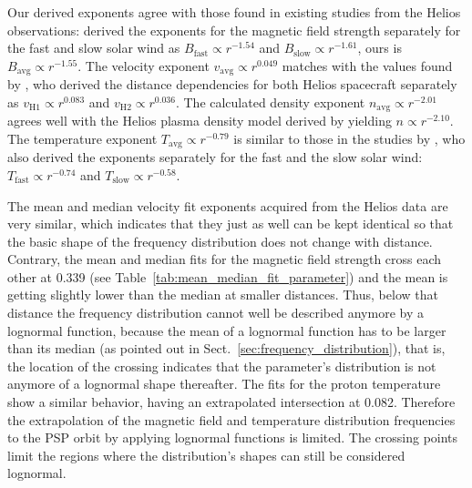 Our derived exponents agree with those found in existing studies from the Helios observations: \citet{Mariani1978} derived the exponents for the magnetic field strength separately for the fast and slow solar wind as $B_\text{fast} \propto r^{-1.54}$ and $B_\text{slow} \propto r^{-1.61}$, ours is $B_\text{avg} \propto r^{-1.55}$.
The velocity exponent $v_\text{avg} \propto r^{0.049}$ matches with the values found by \citet{Schwenn1983,Schwenn1990}, who derived the distance dependencies for both Helios spacecraft separately as $v_\text{H1} \propto r^{0.083}$ and $v_\text{H2} \propto r^{0.036}$. The calculated density exponent $n_\text{avg} \propto r^{-2.01}$ agrees well with the Helios plasma density model derived by \citet{Bougeret1984} yielding $n \propto r^{-2.10}$.
The temperature exponent $T_\text{avg} \propto r^{-0.79}$ is similar to those in the studies by \citet{Hellinger2011,Hellinger2013}, who also derived the exponents separately for the fast and the slow solar wind: $T_\text{fast} \propto r^{-0.74}$ and $T_\text{slow} \propto r^{-0.58}$.

The mean and median velocity fit exponents acquired from the Helios data are very similar, which indicates that they just as well can be kept identical so that the basic shape of the frequency distribution does not change with distance. Contrary, the mean and median fits for the magnetic field strength cross each other at \SI{0.339}{\au} (see Table~\ref{tab:mean_median_fit_parameter}) and the mean is getting slightly lower than the median at smaller distances. Thus, below that distance the frequency distribution cannot well be described anymore by a lognormal function, because the mean of a lognormal function has to be larger than its median (as pointed out in Sect.~\ref{sec:frequency_distribution}), that is, the location of the crossing indicates that the parameter's distribution is not anymore of a lognormal shape thereafter. The fits for the proton temperature show a similar behavior, having an extrapolated intersection at \SI{0.082}{\au}. Therefore the extrapolation of the magnetic field and temperature distribution frequencies to the PSP orbit by applying lognormal functions is limited. The crossing points limit the regions where the distribution's shapes can still be considered lognormal.

